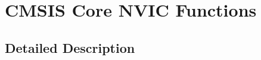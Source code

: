 \hypertarget{group___c_m_s_i_s___core___n_v_i_c_functions}{\section{C\-M\-S\-I\-S Core N\-V\-I\-C Functions}
\label{group___c_m_s_i_s___core___n_v_i_c_functions}
}


\subsection{Detailed Description}
